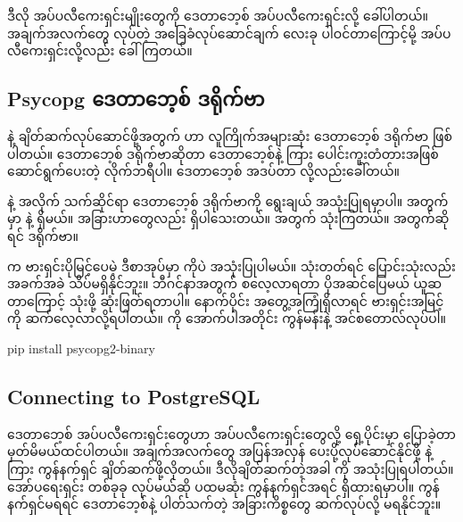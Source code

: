 ဒီလို အပ်ပလီကေးရှင်းမျိုးတွေကို ဒေတာဘေ့စ် အပ်ပလီကေးရှင်းလို့ ခေါ်ပါတယ်။ အချက်အလက်တွေ  လုပ်တဲ့ အခြေခံလုပ်ဆောင်ချက် လေးခု ပါဝင်တာကြောင့်မို့  အပ်ပလီကေးရှင်းလို့လည်း ခေါ်ကြတယ်။  

\subsection*{Psycopg ဒေတာဘေ့စ် ဒရိုက်ဗာ}
 နဲ့  ချိတ်ဆက်လုပ်ဆောင်ဖို့အတွက်  ဟာ လူကြိုက်အများဆုံး ဒေတာဘေ့စ် ဒရိုက်ဗာ ဖြစ်ပါတယ်။ ဒေတာဘေ့စ် ဒရိုက်ဗာဆိုတာ ဒေတာဘေ့စ်နဲ့  ကြား ပေါင်းကူးတံတားအဖြစ် ဆောင်ရွက်ပေးတဲ့ လိုက်ဘရီပါ။ ဒေတာဘေ့စ် အဒပ်တာ  လို့လည်းခေါ်တယ်။

 နဲ့  အလိုက် သက်ဆိုင်ရာ ဒေတာဘေ့စ် ဒရိုက်ဗာကို ရွေးချယ် အသုံးပြုရမှာပါ။  အတွက်  မှာ  နဲ့  ရှိမယ်။ အခြားဟာတွေလည်း ရှိပါသေးတယ်။  အတွက်  သုံးကြတယ်။  အတွက်ဆိုရင်  ဒရိုက်ဗာ။ 

 က ဗားရှင်းပိုမြင့်ပေမဲ့ ဒီစာအုပ်မှာ  ကိုပဲ အသုံးပြုပါမယ်။  သုံးတတ်ရင်  ပြောင်းသုံးလည်း အခက်အခဲ သိပ်မရှိနိုင်ဘူး။ ဘီဂင်နာအတွက် စလေ့လာရတာ ပိုအဆင်ပြေမယ် ယူဆတာကြောင့်  သုံးဖို့ ဆုံးဖြတ်ရတာပါ။ နောက်ပိုင်း အတွေ့အကြုံရှိလာရင် ဗားရှင်းအမြင့်ကို ဆက်လေ့လာလို့ရပါတယ်။  ကို အောက်ပါအတိုင်း  ကွန်မန်းနဲ့  အင်စတောလ်လုပ်ပါ။
%
\begin{codetxt}
pip install psycopg2-binary 
\end{codetxt}
%


\subsection*{Connecting to PostgreSQL}
ဒေတာဘေ့စ် အပ်ပလီကေးရှင်းတွေဟာ  အပ်ပလီကေးရှင်းတွေလို့ ရှေ့ပိုင်းမှာ ပြောခဲ့တာ မှတ်မိမယ်ထင်ပါတယ်။ အချက်အလက်တွေ အပြန်အလှန် ပေးပို့လုပ်ဆောင်နိုင်ဖို့  နဲ့  ကြား ကွန်နက်ရှင် ချိတ်ဆက်ဖို့လိုတယ်။ ဒီလိုချိတ်ဆက်တဲ့အခါ  ကို အသုံးပြုရပါတယ်။  အော်ပရေးရှင်း တစ်ခုခု လုပ်မယ်ဆို ပထမဆုံး ကွန်နက်ရှင်အရင် ရှိထားရမှာပါ။ ကွန်နက်ရှင်မရရင် ဒေတာဘေ့စ်နဲ့ ပါတ်သက်တဲ့ အခြားကိစ္စတွေ ဆက်လုပ်လို့ မရနိုင်ဘူး။ 


